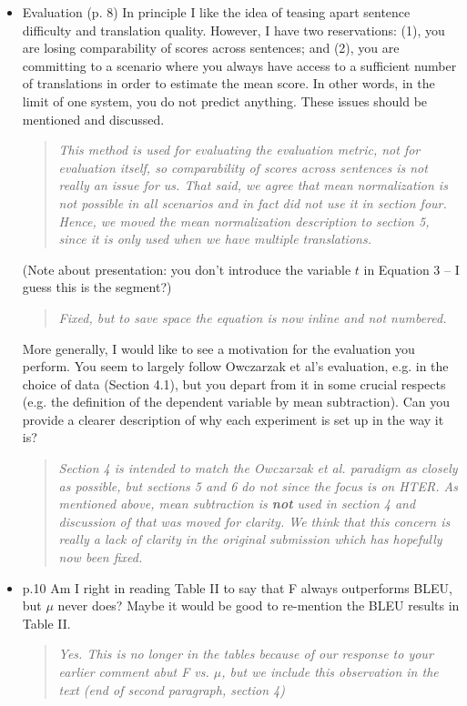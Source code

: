 \documentclass[letterpaper,12pt]{article}
\newenvironment{response}
{\begin{quotation} \it}
  {\end{quotation}}
\begin{document}
\begin{itemize}
\item  Evaluation (p. 8) In principle I like the idea of teasing apart
  sentence difficulty and translation quality. However, I have two
  reservations: (1), you are losing comparability of scores across
  sentences; and (2), you are committing to a scenario where you
  always have access to a sufficient number of translations in order
  to estimate the mean score. In other words, in the limit of one
  system, you do not predict anything.  These issues should be
  mentioned and discussed.  
  \begin{response}
    This method is used for evaluating the evaluation metric, not for
    evaluation itself, so comparability of scores across sentences is
    not really an issue for us.  That said, we agree that mean 
    normalization is not possible in all
    scenarios and in fact did not use it in section four.  Hence, we
    moved the mean normalization description to section 5, since it
    is only used when we have multiple translations.  
  \end{response}
  (Note about presentation: you don't
  introduce the variable $t$ in Equation 3 -- I guess this is the
  segment?)
  \begin{response}
    Fixed, but to save space the equation is now inline and not numbered.
  \end{response}
 
  More generally, I would like to see a motivation for the evaluation
  you perform. You seem to largely follow Owczarzak et al's
  evaluation, e.g. in the choice of data (Section 4.1), but you depart
  from it in some crucial respects (e.g. the definition of the
  dependent variable by mean subtraction). Can you provide a clearer
  description of why each experiment is set up in the way it is?
  \begin{response}
    Section 4 is intended to match the Owczarzak \textit{et al.} paradigm
    as closely as possible, but sections 5 and 6 do not since the focus 
    is on HTER. As mentioned above, mean subtraction is {\bf not} used 
    in section 4 and discussion of that was moved for clarity.  We think
    that this concern is really a lack of clarity in the original submission
    which has hopefully now been fixed.
  \end{response}

\item  p.10 Am I right in reading Table II to say that F always
  outperforms BLEU, but $\mu$ never does? Maybe it would be good to
  re-mention the BLEU results in Table II.
  \begin{response}
   Yes.  This is no longer in the tables because of our response to
   your earlier comment abut F vs. $\mu$, but we include this observation
   in the text (end of second paragraph, section 4)
  \end{response}


\end{itemize}
\end{document}
